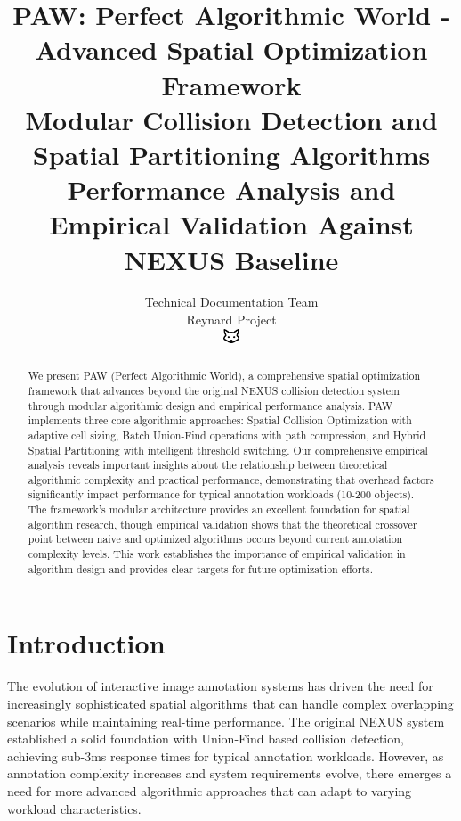 \documentclass[10pt]{article}
\begin{document}
\title{PAW: Perfect Algorithmic World - Advanced Spatial Optimization Framework \\
\Large{Modular Collision Detection and Spatial Partitioning Algorithms} \\
\large{Performance Analysis and Empirical Validation Against NEXUS Baseline}}

\author{Technical Documentation Team\\
Reynard Project\\
\includegraphics[width=0.5cm]{../../shared-assets/favicon.pdf}}
\maketitle

\begin{abstract}
We present PAW (Perfect Algorithmic World), a comprehensive spatial optimization framework that advances beyond the original NEXUS collision detection system through modular algorithmic design and empirical performance analysis. PAW implements three core algorithmic approaches: Spatial Collision Optimization with adaptive cell sizing, Batch Union-Find operations with path compression, and Hybrid Spatial Partitioning with intelligent threshold switching. Our comprehensive empirical analysis reveals important insights about the relationship between theoretical algorithmic complexity and practical performance, demonstrating that overhead factors significantly impact performance for typical annotation workloads (10-200 objects). The framework's modular architecture provides an excellent foundation for spatial algorithm research, though empirical validation shows that the theoretical crossover point between naive and optimized algorithms occurs beyond current annotation complexity levels. This work establishes the importance of empirical validation in algorithm design and provides clear targets for future optimization efforts.
\end{abstract}

\section{Introduction}

The evolution of interactive image annotation systems has driven the need for increasingly sophisticated spatial algorithms that can handle complex overlapping scenarios while maintaining real-time performance. The original NEXUS system established a solid foundation with Union-Find based collision detection, achieving sub-3ms response times for typical annotation workloads. However, as annotation complexity increases and system requirements evolve, there emerges a need for more advanced algorithmic approaches that can adapt to varying workload characteristics.
\end{document}
